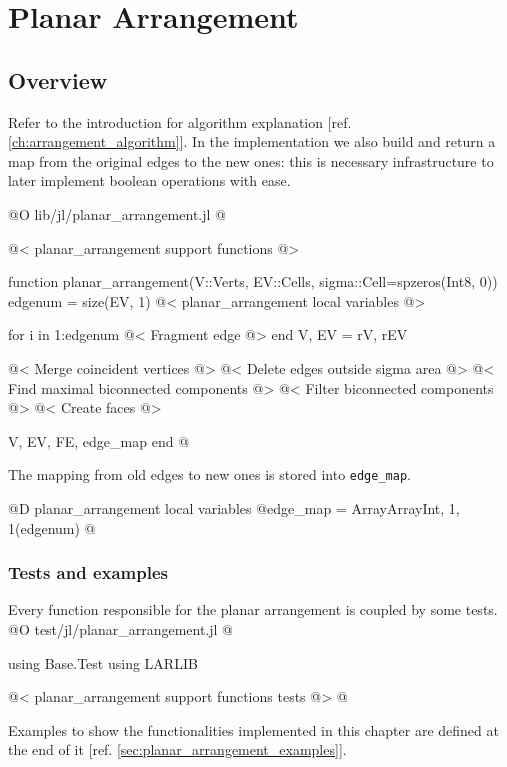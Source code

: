 \chapter{Planar Arrangement}
\label{ch:planar_arrangement}

\section{Overview}
\label{sec:planar_arrangement_intro}

Refer to the introduction for algorithm explanation
[ref. \ref{ch:arrangement_algorithm}].
In the implementation we also build and return a 
map from the original edges to the new ones: this 
is necessary infrastructure to later implement
boolean operations with ease.

@O lib/jl/planar_arrangement.jl
@{@< planar\_arrangement support functions @>

function planar_arrangement(V::Verts, EV::Cells, sigma::Cell=spzeros(Int8, 0))
    edgenum = size(EV, 1)
    @< planar\_arrangement local variables @>

    for i in 1:edgenum
        @< Fragment edge @>
    end
    V, EV = rV, rEV

    @< Merge coincident vertices @>
    @< Delete edges outside sigma area @>
    @< Find maximal biconnected components @>
    @< Filter biconnected components @>
    @< Create faces @>  

    V, EV, FE, edge_map
end 
@}

The mapping from old edges to new ones is stored into \texttt{edge\_map}.

@D planar\_arrangement local variables
@{edge_map = Array{Array{Int, 1}, 1}(edgenum)
@}
\subsection{Tests and examples}
Every function responsible for the planar arrangement is coupled by some tests. 
@O test/jl/planar_arrangement.jl
@{using Base.Test
using LARLIB

@< planar\_arrangement support functions tests @>
@}

Examples to show the functionalities implemented in this chapter
are defined at the end of it [ref. \ref{sec:planar_arrangement_examples}].










